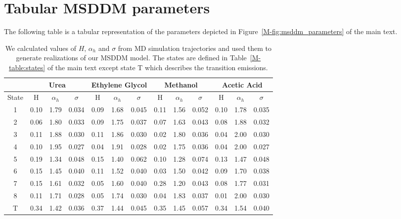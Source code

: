 \documentclass{article}
\begin{document}
  \newpage
  
  \section{Tabular MSDDM parameters}\label{section:msddm_params}
  
  The following table is a tabular representation of the parameters 
  depicted in Figure~\ref{M-fig:msddm_parameters} of the main text.
  
  \begin{table}[h]
  \centering
  \begin{tabular}{|c|c|c|c|c|c|c|c|c|c|c|c|c|}
  \hline
  & \multicolumn{3}{c|}{Urea} & \multicolumn{3}{c|}{Ethylene Glycol} & \multicolumn{3}{c|}{Methanol} & \multicolumn{3}{c|}{Acetic Acid} \\\hline
  State & H     &$\alpha_h$& $\sigma$ & H    &$\alpha_h$& $\sigma$   & H     &$\alpha_h$& $\sigma$ & H    &$\alpha_h$& $\sigma$ \\\hline
  1     & 0.10  & 1.79     & 0.034    & 0.09 & 1.68     & 0.045      & 0.11  & 1.56     & 0.052    & 0.10 & 1.78     & 0.035    \\
  2     & 0.06  & 1.80     & 0.033    & 0.09 & 1.75     & 0.037      & 0.07  & 1.63     & 0.043    & 0.08 & 1.88     & 0.032    \\
  3     & 0.11  & 1.88     & 0.030    & 0.11 & 1.86     & 0.030      & 0.02  & 1.80     & 0.036    & 0.04 & 2.00     & 0.030    \\
  4     & 0.10  & 1.95     & 0.027    & 0.04 & 1.91     & 0.028      & 0.02  & 1.75     & 0.036    & 0.04 & 2.00     & 0.027    \\
  5     & 0.19  & 1.34     & 0.048    & 0.15 & 1.40     & 0.062      & 0.10  & 1.28     & 0.074    & 0.13 & 1.47     & 0.048    \\
  6     & 0.15  & 1.45     & 0.040    & 0.11 & 1.52     & 0.040      & 0.03  & 1.50     & 0.042    & 0.09 & 1.70     & 0.038    \\
  7     & 0.15  & 1.61     & 0.032    & 0.05 & 1.60     & 0.040      & 0.28  & 1.20     & 0.043    & 0.08 & 1.77     & 0.031    \\
  8     & 0.11  & 1.71     & 0.028    & 0.05 & 1.74     & 0.030      & 0.04  & 1.83     & 0.037    & 0.01 & 2.00     & 0.030    \\
  T     & 0.34  & 1.42     & 0.036    & 0.37 & 1.44     & 0.045      & 0.35  & 1.45     & 0.057    & 0.34 & 1.54     & 0.040    \\\hline
  \end{tabular}
  \caption{We calculated values of $H$, $\alpha_h$ and $\sigma$ from MD simulation
  trajectories and used them to generate realizations of our MSDDM model. The states
  are defined in Table~\ref{M-table:states} of the main text except state T which describes the transition
  emissions.}\label{table:msddm_params}
  \end{table}  
  
\end{document}
